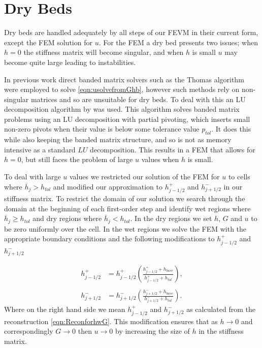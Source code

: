 \section{Dry Beds}




Dry beds are handled adequately by all steps of our FEVM in their current form, except the FEM solution for $u$. For the FEM a dry bed presents two issues; when $h=0$ the stiffness matrix will become singular, and when $h$ is small $u$ may become quite large leading to instabilities. 

In previous work \cite{Zoppou-etal-2017} direct banded matrix solvers such as the Thomas algorithm were employed to solve \eqref{eqn:usolvefromGhb}, however such methods rely on non-singular matrices and so are unsuitable for dry beds. To deal with this an LU decomposition algorithm by \citet{NumRecC-1996} was used. This algorithm solves banded matrix problems using an LU decomposition with partial pivoting, which inserts small non-zero pivots when their value is below some tolerance value $p_{tol}$. It does this while also keeping the banded matrix structure, and so is not as memory intensive as a standard $LU$ decomposition. This results in a FEM that allows for $h=0$, but still faces the problem of large $u$ values when $h$ is small. 

To deal with large $u$ values we restricted our solution of the FEM for $u$ to cells where $\overline{h}_j> h_{tol}$ and modified our approximation to $h^+_{j-1/2}$ and $h^-_{j+1/2}$ in our stiffness matrix. To restrict the domain of our solution we search through the domain at the beginning of each first-order step and identify  wet regions where $\overline{h}_j \ge h_{tol}$ and dry regions where $\overline{h}_j < h_{tol}$. In the dry regions we set $h$, $G$ and $u$ to be zero uniformly over the cell. In the wet regions we solve the FEM with the appropriate boundary conditions and the following modifications to $h^+_{j-1/2}$ and $h^-_{j+1/2}$

\begin{subequations}
\begin{align}
h^+_{j-1/2} & = h^+_{j-1/2} \left(\frac{ h^+_{j-1/2}  + h_{base}}{h^+_{j-1/2} + h_{tol}}\right) , \\ \nonumber\\
h^-_{j+1/2} & = h^-_{j+1/2} \left(\frac{ h^-_{j+1/2}  + h_{base}}{h^-_{j+1/2} + h_{tol}}\right).
\end{align} 
\end{subequations}
Where on the right hand side we mean $h^+_{j-1/2}$ and $h^-_{j+1/2}$ as calculated from the reconstruction \eqref{eqn:ReconforhwG}. This modification ensures that as $h \rightarrow 0$ and correspondingly $G\rightarrow 0 $ then $u \rightarrow 0$ by increasing the size of $h$ in the stiffness matrix. 

